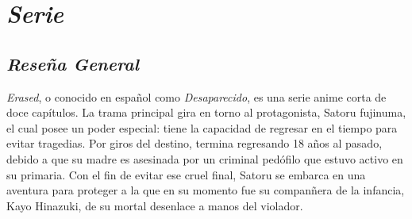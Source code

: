 \documentclass[A5paper, 11pt]{article}
\author{Emiliano Gutiérrez Luengas}
\date{September 2022}
\begin{document}
\pagestyle{fancy}

\pagecolor{gray}


\rfoot{\thepage}
\section{\emph{Serie}}
  \subsection{\textit{Rese\~na General}}
\emph{Erased}, o conocido en espa\~nol como \emph{Desaparecido}, es una serie anime corta de doce cap\'itulos. La trama principal gira en torno al protagonista, Satoru fujinuma, el cual posee un poder especial: tiene la capacidad de regresar en el tiempo para evitar tragedias. Por giros del destino, termina regresando 18 a\~nos al pasado, debido a que su madre es asesinada por un criminal ped\'ofilo que estuvo activo en su primaria. Con el fin de evitar ese cruel final, Satoru se embarca en una aventura para proteger a la que en su momento fue su compan\~nera de la infancia, Kayo Hinazuki, de su mortal desenlace a manos del violador.
\end{document}
